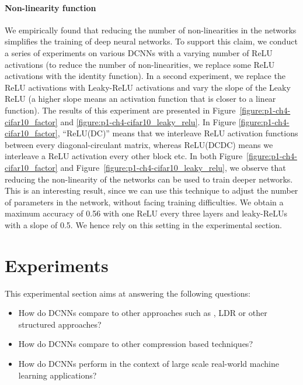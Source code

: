 \paragraph{Non-linearity function}

We empirically found that reducing the number of non-linearities in the networks simplifies the training of deep neural networks.
To support this claim, we conduct a series of experiments on various DCNNs with a varying number of ReLU activations (to reduce the number of non-linearities, we replace some ReLU activations with the identity function).
In a second experiment, we replace the ReLU activations with Leaky-ReLU activations and vary the slope of the Leaky ReLU (a higher slope means an activation function that is closer to a linear function).
The results of this experiment are presented in Figure~\ref{figure:p1-ch4-cifar10_factor} and \ref{figure:p1-ch4-cifar10_leaky_relu}.
In Figure \ref{figure:p1-ch4-cifar10_factor}, ``ReLU(DC)'' means that we interleave ReLU activation functions between every diagonal-circulant matrix, whereas ReLU(DCDC) means we interleave a ReLU activation every other block etc.
In both Figure~\ref{figure:p1-ch4-cifar10_factor} and  Figure~\ref{figure:p1-ch4-cifar10_leaky_relu}, we observe that reducing the non-linearity of the networks can be used to train deeper networks.
This is an interesting result, since  we can use this technique to adjust the number of parameters in the network, without facing training difficulties. We obtain a maximum accuracy of 0.56 with one ReLU every three layers and leaky-ReLUs with a slope of 0.5.
We hence rely on this setting in the experimental section. 

\section{Experiments}
\label{section:p1-ch4-experiments}

This experimental section aims at answering the following questions:
\begin{itemize}
    \item[] How do DCNNs compare to other approaches such as \ACDC, LDR or other structured approaches?
    \item[] How do DCNNs compare to other compression based techniques?
    \item[] How do DCNNs perform in the context of large scale real-world machine learning applications?  
\end{itemize}


